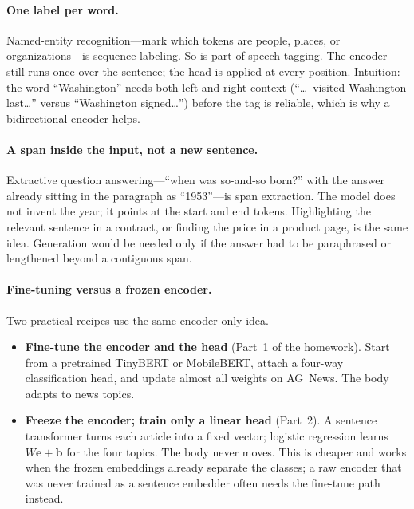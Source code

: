 \documentclass[11pt]{article}
\begin{document}
\paragraph{One label per word.}
Named-entity recognition---mark which tokens are people, places, or
organizations---is sequence labeling. So is part-of-speech tagging. The
encoder still runs once over the sentence; the head is applied at every
position. Intuition: the word ``Washington'' needs both left and right
context (``\ldots\ visited Washington last\ldots'' versus ``Washington
signed\ldots'') before the tag is reliable, which is why a bidirectional
encoder helps.

\paragraph{A span inside the input, not a new sentence.}
Extractive question answering---``when was so-and-so born?'' with the
answer already sitting in the paragraph as ``1953''---is span extraction.
The model does not invent the year; it points at the start and end tokens.
Highlighting the relevant sentence in a contract, or finding the price in
a product page, is the same idea. Generation would be needed only if the
answer had to be paraphrased or lengthened beyond a contiguous span.

\paragraph{Fine-tuning versus a frozen encoder.}
Two practical recipes use the same encoder-only idea.
\begin{itemize}[leftmargin=*]
  \item \textbf{Fine-tune the encoder and the head} (Part~1 of the
        homework). Start from a pretrained TinyBERT or MobileBERT, attach
        a four-way classification head, and update almost all weights on
        AG~News. The body adapts to news topics.
  \item \textbf{Freeze the encoder; train only a linear head} (Part~2).
        A sentence transformer turns each article into a fixed vector;
        logistic regression learns \(W\mathbf{e}+\mathbf{b}\) for the four
        topics. The body never moves. This is cheaper and works when the
        frozen embeddings already separate the classes; a raw encoder that
        was never trained as a sentence embedder often needs the fine-tune
        path instead.
\end{itemize}
\end{document}
